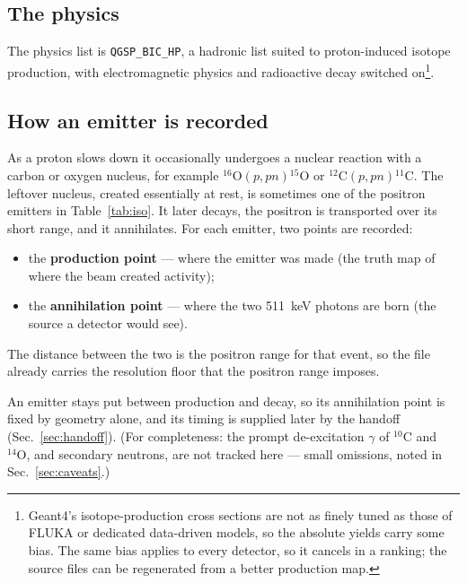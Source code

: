 \documentclass[11pt]{article}
\newcommand{\Cl}[1]{{}^{#1}\mathrm{C}}
\newcommand{\Ox}[1]{{}^{#1}\mathrm{O}}
\begin{document}
\subsection{The physics}
\label{sec:physics}
The physics list is \texttt{QGSP\_BIC\_HP}, a hadronic list suited to proton-induced
isotope production, with electromagnetic physics and radioactive decay switched on\footnote{Geant4's isotope-production cross sections are not
as finely tuned as those of FLUKA or dedicated data-driven models, so the absolute yields carry
some bias. The same bias applies to every detector, so it cancels in a ranking; the source
files can be regenerated from a better production map.}.

\subsection{How an emitter is recorded}
\label{sec:production}
As a proton slows down it occasionally undergoes a nuclear reaction with a carbon or
oxygen nucleus, for example $\Ox{16}(p,pn)\Ox{15}$ or $\Cl{12}(p,pn)\Cl{11}$. The
leftover nucleus, created essentially at rest, is sometimes one of the positron
emitters in Table~\ref{tab:iso}. It later decays, the positron is transported over
its short range, and it annihilates. For each emitter, two points are recorded:
\begin{itemize}[nosep]
\item the \textbf{production point} --- where the emitter was made (the truth map of
where the beam created activity);
\item the \textbf{annihilation point} --- where the two \SI{511}{keV} photons are born
(the source a detector would see).
\end{itemize}
The distance between the two is the positron range for that event, so the file already
carries the resolution floor that the positron range imposes.

An emitter stays put between production and decay, so its annihilation point is fixed
by geometry alone, and its timing is supplied later by the handoff
(Sec.~\ref{sec:handoff}). (For completeness: the prompt de-excitation $\gamma$ of
$\Cl{10}$ and $\Ox{14}$, and secondary neutrons, are not tracked here --- small
omissions, noted in Sec.~\ref{sec:caveats}.)
\end{document}
